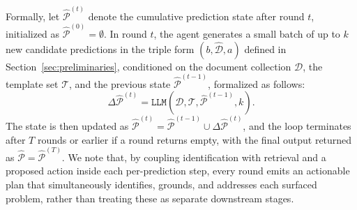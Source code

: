 Formally, let $\hat{\mathcal{P}}^{(t)}$ denote the cumulative prediction state after round $t$, initialized as $\hat{\mathcal{P}}^{(0)} = \emptyset$. In round $t$, the agent generates a small batch of up to $k$ new candidate predictions in the triple form $(b, \hat{\mathcal{D}}, a)$ defined in Section~\ref{sec:preliminaries}, conditioned on the document collection $\mathcal{D}$, the template set $\mathcal{T}$, and the previous state $\hat{\mathcal{P}}^{(t-1)}$, formalized as follows:
\begin{equation}
\Delta \hat{\mathcal{P}}^{(t)} = \texttt{LLM}\!\left(\mathcal{D}, \mathcal{T}, \hat{\mathcal{P}}^{(t-1)}, k\right).
\label{eq:iterative_discovery}
\end{equation}
The state is then updated as $\hat{\mathcal{P}}^{(t)} = \hat{\mathcal{P}}^{(t-1)} \cup \Delta \hat{\mathcal{P}}^{(t)}$, and the loop terminates after $T$ rounds or earlier if a round returns empty, with the final output returned as $\hat{\mathcal{P}} = \hat{\mathcal{P}}^{(T)}$. We note that, by coupling identification with retrieval and a proposed action inside each per-prediction step, every round emits an actionable plan that simultaneously identifies, grounds, and addresses each surfaced problem, rather than treating these as separate downstream stages.
